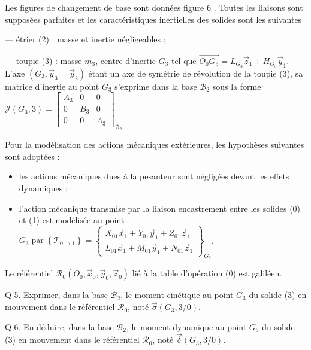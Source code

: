 Les figures de changement de base sont données figure 6 . Toutes les liaisons sont supposées parfaites et les caractéristiques inertielles des solides sont les suivantes

— étrier (2) : masse et inertie négligeables ;

— toupie (3) : masse $m_{3}$, centre d'inertie $G_{3}$ tel que $\overrightarrow{O_{0} G_{3}}=L_{G_{3}} \vec{z}_{1}+H_{G_{3}} \vec{y}_{1}$. L'axe $\left(G_{3}, \vec{y}_{3}=\vec{y}_{2}\right)$ étant un axe de symétrie de révolution de la toupie (3), sa matrice d'inertie au point $G_{3}$ s'exprime dans la base $\mathcal{B}_{2}$ sous la forme $\mathcal{J}\left(G_{3}, 3\right)=\left[\begin{array}{ccc}A_{3} & 0 & 0 \\ 0 & B_{3} & 0 \\ 0 & 0 & A_{3}\end{array}\right]_{\mathcal{B}_{2}}$

Pour la modélisation des actions mécaniques extérieures, les hypothèses suivantes sont adoptées :

\begin{itemize}
  \item les actions mécaniques dues à la pesanteur sont négligées devant les effets dynamiques ;

  \item l'action mécanique transmise par la liaison encastrement entre les solides (0) et (1) est modélisée au point $G_{3} \operatorname{par}\left\{\mathcal{T}_{0 \rightarrow 1}\right\}=\left\{\begin{array}{c}X_{01} \vec{x}_{1}+Y_{01} \vec{y}_{1}+Z_{01} \vec{z}_{1} \\ L_{01} \vec{x}_{1}+M_{01} \vec{y}_{1}+N_{01} \vec{z}_{1}\end{array}\right\}_{G_{3}}$.

\end{itemize}

Le référentiel $\mathcal{R}_{0}\left(O_{0}, \vec{x}_{0}, \vec{y}_{0}, \vec{z}_{0}\right)$ lié à la table d'opération (0) est galiléen.

Q 5. Exprimer, dans la base $\mathcal{B}_{2}$, le moment cinétique au point $G_{3}$ du solide (3) en mouvement dans le référentiel $\mathcal{R}_{0}$, noté $\vec{\sigma}\left(G_{3}, 3 / 0\right)$.

Q 6. En déduire, dans la base $\mathcal{B}_{2}$, le moment dynamique au point $G_{3}$ du solide (3) en mouvement dans le référentiel $\mathcal{R}_{0}$, noté $\vec{\delta}\left(G_{3}, 3 / 0\right)$.

